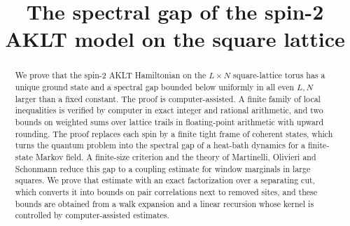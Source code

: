 \documentclass[11pt,reqno]{amsart}
\theoremstyle{plain}
\theoremstyle{definition}
\theoremstyle{remark}
\numberwithin{equation}{section}
\begin{document}
\title{The spectral gap of the spin-2 AKLT model on the square lattice}

\begin{abstract}
We prove that the spin-2 AKLT Hamiltonian on the $L \times N$ square-lattice torus has a unique ground state and a spectral gap bounded below uniformly in all even $L, N$ larger than a fixed constant. The proof is computer-assisted. A finite family of local inequalities is verified by computer in exact integer and rational arithmetic, and two bounds on weighted sums over lattice trails in floating-point arithmetic with upward rounding. The proof replaces each spin by a finite tight frame of coherent states, which turns the quantum problem into the spectral gap of a heat-bath dynamics for a finite-state Markov field. A finite-size criterion and the theory of Martinelli, Olivieri and Schonmann reduce this gap to a coupling estimate for window marginals in large squares. We prove that estimate with an exact factorization over a separating cut, which converts it into bounds on pair correlations next to removed sites, and these bounds are obtained from a walk expansion and a linear recursion whose kernel is controlled by computer-assisted estimates.
\end{abstract}

\maketitle
\setcounter{tocdepth}{1}
\tableofcontents










\appendix




\end{document}
